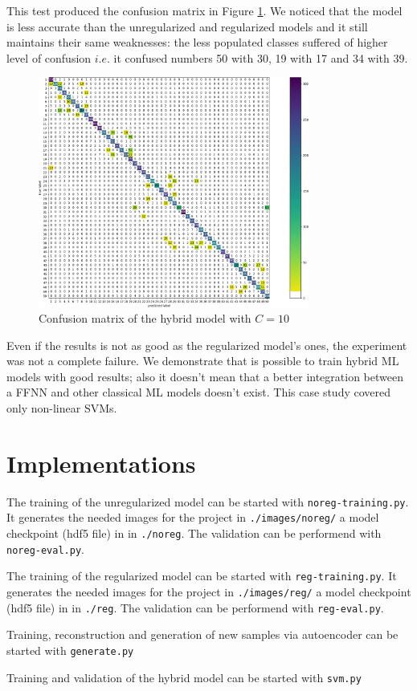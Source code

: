 \documentclass[compsoc]{IEEEtran}
\begin{document}
This test produced the confusion matrix in Figure \ref{fig:c10}. We noticed that the model is less accurate than the unregularized and regularized models and it still maintains their same weaknesses: the less populated classes suffered of higher level of confusion $i.e.$ it confused numbers 50 with 30, 19 with 17 and 34 with 39.


\begin{figure}[ht!]
\centering                                                                        
\includegraphics[width=3.5in]{c10.png}
\captionsetup{justification=centering}                                                                                       
\caption{Confusion matrix of the hybrid model with $C=10$}
\label{fig:c10}
\end{figure}

Even if the results is not as good as the regularized model's ones, the experiment was not a complete failure. We demonstrate that is possible to train hybrid ML models with good results; also it doesn't mean that a better integration between a FFNN and other classical ML models doesn't exist. This case study covered only non-linear SVMs.

\section{Implementations}
The training of the unregularized model can be started with \texttt{noreg-training.py}. It generates the needed images for the project in \texttt{./images/noreg/}
a model checkpoint (hdf5 file) in in \texttt{./noreg}. The validation can be performend with \texttt{noreg-eval.py}.\par
The training of the regularized model can be started with \texttt{reg-training.py}. It generates the needed images for the project in \texttt{./images/reg/}
a model checkpoint (hdf5 file) in in \texttt{./reg}. The validation can be performend with \texttt{reg-eval.py}.\par
Training, reconstruction and generation of new samples via autoencoder can be started with \texttt{generate.py} \par
Training and validation of the hybrid model can be started with \texttt{svm.py}
\end{document}
